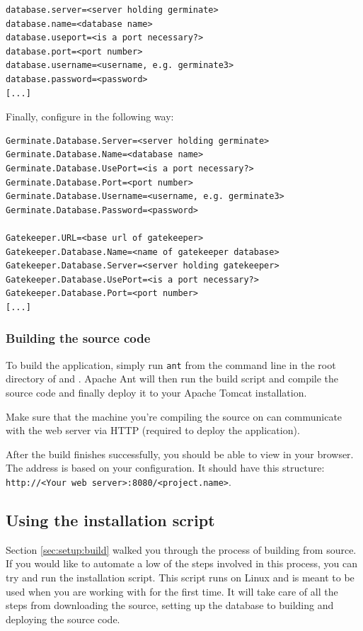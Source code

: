 \begin{lstlisting}[style=Properties]
database.server=<server holding germinate>
database.name=<database name>
database.useport=<is a port necessary?>
database.port=<port number>
database.username=<username, e.g. germinate3>
database.password=<password>
[...]
\end{lstlisting}
\noindent
Finally, configure {\germinate} in the following way:

\begin{lstlisting}[style=Properties]
Germinate.Database.Server=<server holding germinate>
Germinate.Database.Name=<database name>
Germinate.Database.UsePort=<is a port necessary?>
Germinate.Database.Port=<port number>
Germinate.Database.Username=<username, e.g. germinate3>
Germinate.Database.Password=<password>

Gatekeeper.URL=<base url of gatekeeper>
Gatekeeper.Database.Name=<name of gatekeeper database>
Gatekeeper.Database.Server=<server holding gatekeeper>
Gatekeeper.Database.UsePort=<is a port necessary?>
Gatekeeper.Database.Port=<port number>
[...]
\end{lstlisting}

\subsubsection{Building the source code}
To build the application, simply run \texttt{ant} from the command line in the root directory of {\germinate} and {\gatekeeper}. Apache Ant will then run the build script and compile the source code and finally deploy it to your Apache Tomcat installation.

Make sure that the machine you're compiling the source on can communicate with the web server via HTTP (required to deploy the application).

After the build finishes successfully, you should be able to view {\germinate} in your browser. The address is based on your configuration. It should have this structure: \texttt{http://<Your web server>:8080/<project.name>}.

\subsection{Using the {\germinate} installation script}
Section \ref{sec:setup:build} walked you through the process of building {\germinate} from source. If you would like to automate a low of the steps involved in this process, you can try and run the {\germinate} installation script. This script runs on Linux and is meant to be used when you are working with {\germinate} for the first time. It will take care of all the steps from downloading the source, setting up the database to building and deploying the source code.

